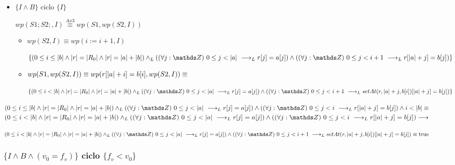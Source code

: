 \documentclass{article}
\begin{document}
\begin{itemize}
    \item $\{I \wedge B\}$ ciclo $\{ I \}$
    
    $wp(S1;S2;, I) \stackrel{Ax3}{\equiv} wp(S1,wp(S2,I))$

    \begin{itemize}
        \item $wp(S2, I) \equiv wp(i:= i+1, I)$

        $ \{ (0 \leq i \leq \longitud{b} \wedge \longitud{r} = \longitud{R_{0}} \wedge \longitud{r} = \longitud{a} + \longitud{b}) \yLuego (\paraTodo{j}{0}{\longitud{a}} \implicaLuego r[j] = a[j]) \wedge (\paraTodo{j}{0}{i+1} \implicaLuego r[\longitud{a}+j]=b[j]) \} $

        \item $wp(S1,wp(S2, I))\equiv wp(r[|a|+i] = b[i],wp(S2, I)) \equiv$

        $ \{ (0 \leq i < \longitud{b} \wedge \longitud{r} = \longitud{R_{0}} \wedge \longitud{r} = \longitud{a} + \longitud{b}) \yLuego (\paraTodo{j}{0}{\longitud{a}} \implicaLuego r[j] = a[j]) \wedge (\paraTodo{j}{0}{i+1} \implicaLuego setAt(r,\longitud{a}+j,b[i])[\longitud{a}+j]=b[j]) \}$
    \end{itemize}

\end{itemize}

$ (0 \leq i \leq \longitud{b} \wedge \longitud{r} = \longitud{R_{0}} \wedge \longitud{r} = \longitud{a} + \longitud{b}) \yLuego (\paraTodo{j}{0}{\longitud{a}} \implicaLuego r[j] = a[j]) \wedge (\paraTodo{j}{0}{i} \implicaLuego r[\longitud{a}+j]=b[j]) \wedge i < \longitud{b} \equiv $ \\

$ (0 \leq i < \longitud{b} \wedge \longitud{r} = \longitud{R_{0}} \wedge \longitud{r} = \longitud{a} + \longitud{b}) \yLuego (\paraTodo{j}{0}{\longitud{a}} \implicaLuego r[j] = a[j]) \wedge (\paraTodo{j}{0}{i} \implicaLuego r[\longitud{a}+j]=b[j]) \implica $

$ (0 \leq i < \longitud{b} \wedge \longitud{r} = \longitud{R_{0}} \wedge \longitud{r} = \longitud{a} + \longitud{b}) \yLuego (\paraTodo{j}{0}{\longitud{a}} \implicaLuego r[j] = a[j]) \wedge (\paraTodo{j}{0}{i+1} \implicaLuego setAt(r,\longitud{a}+j,b[i])[\longitud{a}+j]=b[j]) \equiv \True $

\subsubsection*{$\{I \wedge B \wedge (v_{0} = f_{v})\}$ ciclo $\{f_{v} < v_{0}\}$}
\end{document}
